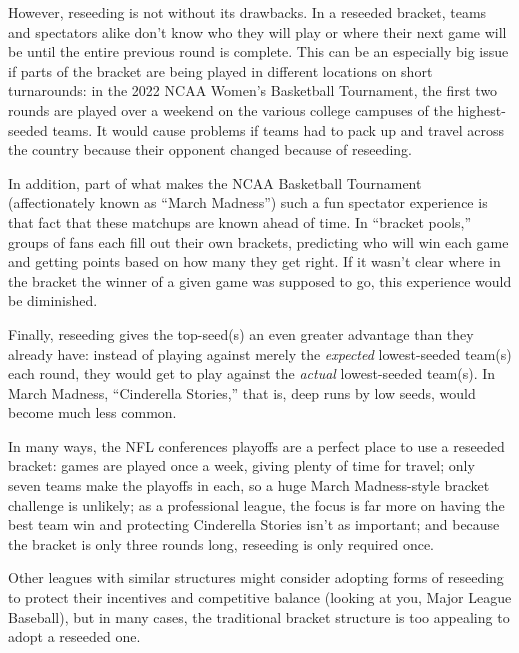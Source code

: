 {{    %
}{}




However, reseeding is not without its drawbacks. In a reseeded bracket, teams and spectators alike don't know who they will play or where their next game will be until the entire previous round is complete. This can be an especially big issue if parts of the bracket are being played in different locations on short turnarounds: in the 2022 NCAA Women's Basketball Tournament, the first two rounds are played over a weekend on the various college campuses of the highest-seeded teams. It would cause problems if teams had to pack up and travel across the country because their opponent changed because of reseeding.

In addition, part of what makes the NCAA Basketball Tournament (affectionately known as ``March Madness'') such a fun spectator experience is that fact that these matchups are known ahead of time. In ``bracket pools,'' groups of fans each fill out their own brackets, predicting who will win each game and getting points based on how many they get right. If it wasn't clear where in the bracket the winner of a given game was supposed to go, this experience would be diminished.

Finally, reseeding gives the top-seed(s) an even greater advantage than they already have: instead of playing against merely the \textit{expected} lowest-seeded team(s) each round, they would get to play against the \textit{actual} lowest-seeded team(s). In March Madness, ``Cinderella Stories,'' that is, deep runs by low seeds, would become much less common.

In many ways, the NFL conferences playoffs are a perfect place to use a reseeded bracket: games are played once a week, giving plenty of time for travel; only seven teams make the playoffs in each, so a huge March Madness-style bracket challenge is unlikely; as a professional league, the focus is far more on having the best team win and protecting Cinderella Stories isn't as important; and because the bracket is only three rounds long, reseeding is only required once.

Other leagues with similar structures might consider adopting forms of reseeding to protect their incentives and competitive balance (looking at you, Major League Baseball), but in many cases, the traditional bracket structure is too appealing to adopt a reseeded one.
}